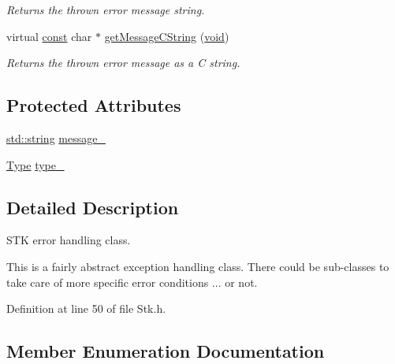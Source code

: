 \begin{DoxyCompactItemize}
\begin{DoxyCompactList}\small\item\em Returns the thrown error message string. \end{DoxyCompactList}\item 
virtual \hyperlink{getopt1_8c_a2c212835823e3c54a8ab6d95c652660e}{const} char $\ast$ \hyperlink{class_nyq_1_1_stk_error_adcb3933c332ad425b3b3aabe42f9a31f}{get\+Message\+C\+String} (\hyperlink{sound_8c_ae35f5844602719cf66324f4de2a658b3}{void})
\begin{DoxyCompactList}\small\item\em Returns the thrown error message as a C string. \end{DoxyCompactList}\end{DoxyCompactItemize}
\subsection*{Protected Attributes}
\begin{DoxyCompactItemize}
\item 
\hyperlink{test__lib_f_l_a_c_2format_8c_ab02026ad0de9fb6c1b4233deb0a00c75}{std\+::string} \hyperlink{class_nyq_1_1_stk_error_a7b701dc3b509a78a48277c983e1aa5d8}{message\+\_\+}
\item 
\hyperlink{class_nyq_1_1_stk_error_a5fde28aabab32abdb02b1078542bd3e8}{Type} \hyperlink{class_nyq_1_1_stk_error_a01ed82f721c5ec80a6c7d07699cffd60}{type\+\_\+}
\end{DoxyCompactItemize}


\subsection{Detailed Description}
S\+TK error handling class. 

This is a fairly abstract exception handling class. There could be sub-\/classes to take care of more specific error conditions ... or not. 

Definition at line 50 of file Stk.\+h.



\subsection{Member Enumeration Documentation}
